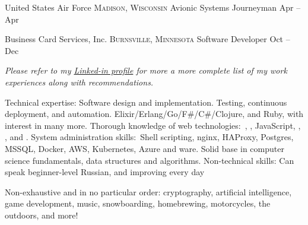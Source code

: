 \documentclass[10pt,a4paper]{article}
\begin{document}
\headedsection
  {United States Air Force}
  {\textsc{Madison, Wisconsin}} {%
  \headedsubsection
    {Avionic Systems Journeyman}
    {Apr  -- Apr }
    {}
}

\headedsection
  {Business Card Services, Inc.}
  {\textsc{Burnsville, Minnesota}} {%
  \headedsubsection
    {Software Developer}
    {Oct  -- Dec }
    {}
}


\vspace{-0.2em}
\begin{center}
  \emph{\small Please refer to my \href{http://www.linkedin.com/in/gotbones}{Linked-in profile} for more a more complete list of my work experiences along with recommendations.}
\end{center}


\spacedhrule{-0.2em}{-0.4em}


\inlineheadsection  %
  {Technical expertise:}
  {Software design and implementation. Testing, continuous deployment, and automation. Elixir/\nsp Erlang/\nsp Go/\nsp F\#/\nsp C\#/\nsp Clojure, and Ruby, with interest in many more. Thorough knowledge of web technologies:\ , , JavaScript, , , and . System administration skills:\ Shell scripting, nginx, HAProxy, Postgres, MSSQL, Docker, AWS, Kubernetes, Azure and ware. Solid base in computer science fundamentals, data structures and algorithms.}
\inlineheadsection
  {Non-technical skills:}
  {Can speak beginner-level Russian, and improving every day}


\inlineheadsection
  {Non-exhaustive and in no particular order:}
  {cryptography, artificial intelligence, game development, music, snowboarding, homebrewing, motorcycles, the outdoors, and more!}
\end{document}
